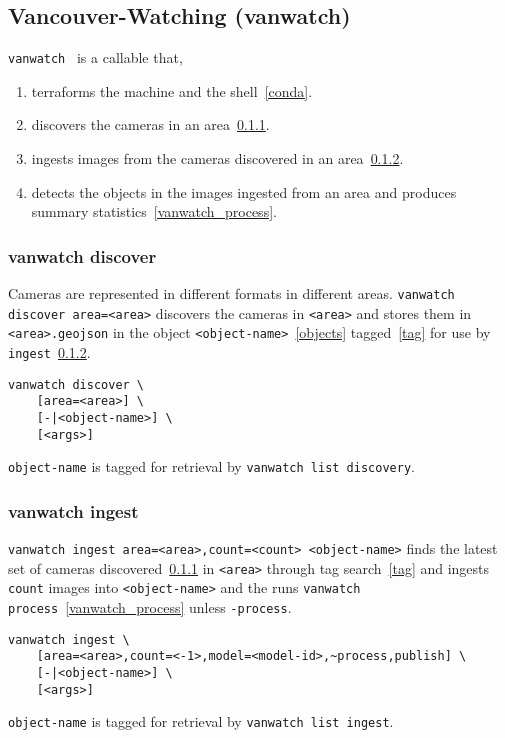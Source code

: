 \subsection{Vancouver-Watching (vanwatch)}
\label{vanwatch}

\texttt{vanwatch}~ is a callable that,
%
\begin{enumerate}
    \item{terraforms the machine and the shell~\ref{conda}.}
    \item{discovers the cameras in an area~\ref{vanwatch_discover}.}
    \item{ingests images from the cameras discovered in an area~\ref{vanwatch_ingest}.}
    \item{detects the objects in the images ingested from an area and produces summary statistics~\ref{vanwatch_process}.}
\end{enumerate}

\subsubsection{vanwatch discover}
\label{vanwatch_discover}

Cameras are represented in different formats in different areas. \texttt{vanwatch discover area=<area>} discovers the cameras in \texttt{<area>} and stores them in \texttt{<area>.geojson} in the object \texttt{<object-name>}~\ref{objects} tagged~\ref{tag} for use by \texttt{ingest}~\ref{vanwatch_ingest}.
%
\begin{verbatim}
vanwatch discover \
    [area=<area>] \
    [-|<object-name>] \
    [<args>]
\end{verbatim}
%
\texttt{object-name} is tagged for retrieval by \texttt{vanwatch list discovery}. 

\subsubsection{vanwatch ingest}
\label{vanwatch_ingest}

\texttt{vanwatch ingest area=<area>,count=<count> <object-name>} finds the latest set of cameras discovered~\ref{vanwatch_discover} in \texttt{<area>} through tag search~\ref{tag} and ingests \texttt{count} images into \texttt{<object-name>} and the runs \texttt{vanwatch process}~\ref{vanwatch_process} unless \texttt{-process}.
%
\begin{verbatim}
vanwatch ingest \
    [area=<area>,count=<-1>,model=<model-id>,~process,publish] \
    [-|<object-name>] \
    [<args>]
\end{verbatim}
%
\texttt{object-name} is tagged for retrieval by \texttt{vanwatch list ingest}. 

